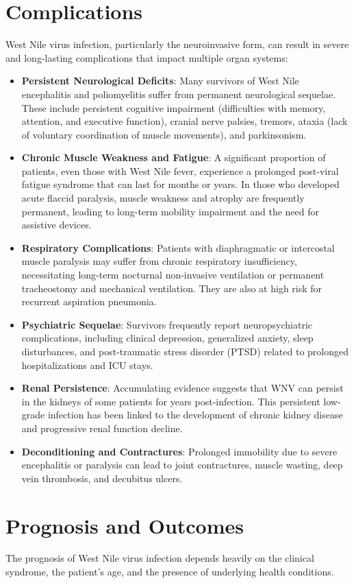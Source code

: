 \section*{Complications}
West Nile virus infection, particularly the neuroinvasive form, can result in severe and long-lasting complications that impact multiple organ systems:
\begin{itemize}
    \item \textbf{Persistent Neurological Deficits}: Many survivors of West Nile encephalitis and poliomyelitis suffer from permanent neurological sequelae. These include persistent cognitive impairment (difficulties with memory, attention, and executive function), cranial nerve palsies, tremors, ataxia (lack of voluntary coordination of muscle movements), and parkinsonism.
    \item \textbf{Chronic Muscle Weakness and Fatigue}: A significant proportion of patients, even those with West Nile fever, experience a prolonged post-viral fatigue syndrome that can last for months or years. In those who developed acute flaccid paralysis, muscle weakness and atrophy are frequently permanent, leading to long-term mobility impairment and the need for assistive devices.
    \item \textbf{Respiratory Complications}: Patients with diaphragmatic or intercostal muscle paralysis may suffer from chronic respiratory insufficiency, necessitating long-term nocturnal non-invasive ventilation or permanent tracheostomy and mechanical ventilation. They are also at high risk for recurrent aspiration pneumonia.
    \item \textbf{Psychiatric Sequelae}: Survivors frequently report neuropsychiatric complications, including clinical depression, generalized anxiety, sleep disturbances, and post-traumatic stress disorder (PTSD) related to prolonged hospitalizations and ICU stays.
    \item \textbf{Renal Persistence}: Accumulating evidence suggests that WNV can persist in the kidneys of some patients for years post-infection. This persistent low-grade infection has been linked to the development of chronic kidney disease and progressive renal function decline.
    \item \textbf{Deconditioning and Contractures}: Prolonged immobility due to severe encephalitis or paralysis can lead to joint contractures, muscle wasting, deep vein thrombosis, and decubitus ulcers.
\end{itemize}

\section*{Prognosis and Outcomes}
The prognosis of West Nile virus infection depends heavily on the clinical syndrome, the patient's age, and the presence of underlying health conditions.

